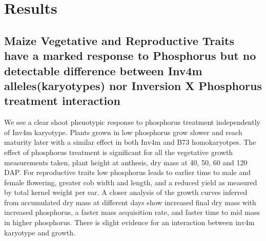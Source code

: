 





\section{Results}

\subsection{Maize Vegetative and Reproductive Traits have a marked response to Phosphorus but no detectable difference between Inv4m alleles(karyotypes) nor  Inversion X Phosphorus treatment interaction}

We see a clear shoot phenotypic response to phosphorus treatment independently of Inv4m karyotype. 
Plants grown in low phosphorus grow slower and reach maturity later with a similar effect in both Inv4m and B73 homokaryotpes. 
The effect of phosphorus treatment is significant for all the vegetative growth measurements taken, plant height at anthesis, dry mass at 40, 50, 60 and 120 DAP.  
For reproductive traits low phosphorus leads to earlier time to male and female flowering, greater cob width and length, and a reduced yield as measured by total kernel weight per ear.
A closer analysis of the growth curves inferred from accumulated dry mass at different days show increased final dry mass  with increased phosphorus, a faster mass acquisition rate, and faster time to mid mass in higher phosphorus. 
There is slight evidence for an interaction between inv4m karyotype and growth. 

